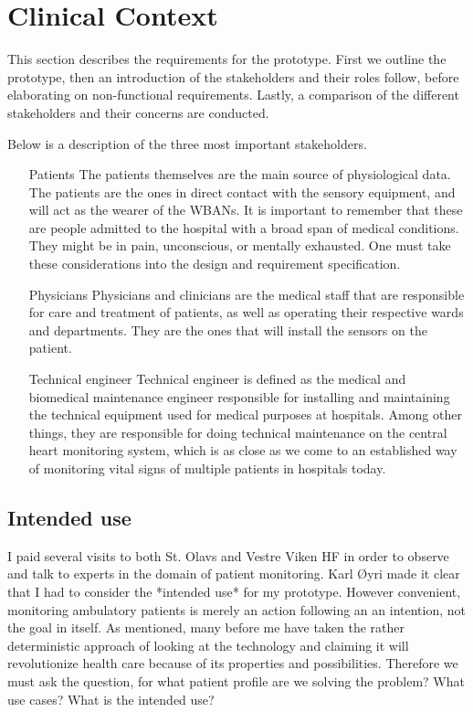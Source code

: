 \section{Clinical Context} %
\label{sec:clinical_context}

This section describes the requirements for the prototype. First we outline the prototype, then an introduction of the stakeholders and their roles follow, before elaborating on non-functional requirements. Lastly, a comparison of the different stakeholders and their concerns are conducted. 

Below is a description of the three most important stakeholders.

\begin{itemize}

  \item[Patients] The patients themselves are the main source of physiological data. The patients are the ones in direct contact with the sensory equipment, and will act as the wearer of the  WBANs. It is important to remember that these are people admitted to the hospital with a broad span of medical conditions. They might be in pain, unconscious, or mentally exhausted. One must take these considerations into the design and requirement specification.

  \item[Physicians] Physicians and clinicians are the medical staff that are responsible for care and treatment of patients, as well as operating their respective wards and departments. They are the ones that will install the sensors on the patient.

  \item[Technical engineer] Technical engineer is defined as the medical and biomedical maintenance engineer responsible for installing and maintaining the technical equipment used for medical purposes at hospitals. Among other things, they are responsible for doing technical maintenance  on the central heart monitoring system, which is as close as we come to an established way of monitoring vital signs of multiple patients in hospitals today.

\end{itemize}


\subsection{Intended use} %
\label{sub:intended_use}

I paid several visits to both St. Olavs and Vestre Viken HF in order to observe and talk to experts in the domain of patient monitoring. Karl Øyri made it clear that I had to consider the *intended use* for my prototype. However convenient, monitoring ambulatory patients is merely an action following an an intention, not the goal in itself. As mentioned, many before me have taken the rather deterministic approach of looking at the technology and claiming it will revolutionize health care because of its properties and possibilities. Therefore we must ask the question, for what patient profile are we solving the problem? What use cases? What is the intended use?

